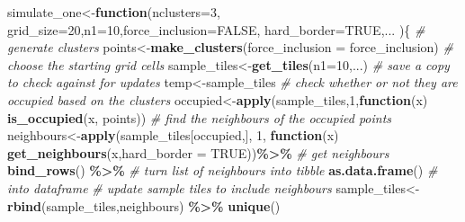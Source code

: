 \documentclass[
]{article}
\newenvironment{Shaded}{\begin{snugshade}}{\end{snugshade}}
\newcommand{\AttributeTok}[1]{\textcolor[rgb]{0.13,0.29,0.53}{#1}}
\newcommand{\CommentTok}[1]{\textcolor[rgb]{0.56,0.35,0.01}{\textit{#1}}}
\newcommand{\ConstantTok}[1]{\textcolor[rgb]{0.56,0.35,0.01}{#1}}
\newcommand{\ControlFlowTok}[1]{\textcolor[rgb]{0.13,0.29,0.53}{\textbf{#1}}}
\newcommand{\DecValTok}[1]{\textcolor[rgb]{0.00,0.00,0.81}{#1}}
\newcommand{\FunctionTok}[1]{\textcolor[rgb]{0.13,0.29,0.53}{\textbf{#1}}}
\newcommand{\NormalTok}[1]{#1}
\newcommand{\OtherTok}[1]{\textcolor[rgb]{0.56,0.35,0.01}{#1}}
\newcommand{\SpecialCharTok}[1]{\textcolor[rgb]{0.81,0.36,0.00}{\textbf{#1}}}
\begin{document}
\begin{Shaded}
\begin{Highlighting}[]
\NormalTok{simulate\_one}\OtherTok{\textless{}{-}}\ControlFlowTok{function}\NormalTok{(}\AttributeTok{nclusters=}\DecValTok{3}\NormalTok{, }\AttributeTok{grid\_size=}\DecValTok{20}\NormalTok{,}\AttributeTok{n1=}\DecValTok{10}\NormalTok{,}\AttributeTok{force\_inclusion=}\ConstantTok{FALSE}\NormalTok{, }\AttributeTok{hard\_border=}\ConstantTok{TRUE}\NormalTok{,... )\{}
  \CommentTok{\# generate clusters}
\NormalTok{  points}\OtherTok{\textless{}{-}}\FunctionTok{make\_clusters}\NormalTok{(}\AttributeTok{force\_inclusion =}\NormalTok{ force\_inclusion)}
  \CommentTok{\# choose the starting grid cells}
\NormalTok{  sample\_tiles}\OtherTok{\textless{}{-}}\FunctionTok{get\_tiles}\NormalTok{(}\AttributeTok{n1=}\DecValTok{10}\NormalTok{,...)}
  \CommentTok{\# save a copy to check against for updates}
\NormalTok{  temp}\OtherTok{\textless{}{-}}\NormalTok{sample\_tiles}
  \CommentTok{\# check whether or not they are occupied based on the clusters}
\NormalTok{  occupied}\OtherTok{\textless{}{-}}\FunctionTok{apply}\NormalTok{(sample\_tiles,}\DecValTok{1}\NormalTok{,}\ControlFlowTok{function}\NormalTok{(x) }\FunctionTok{is\_occupied}\NormalTok{(x, points))}
  \CommentTok{\# find the neighbours of the occupied points}
\NormalTok{  neighbours}\OtherTok{\textless{}{-}}\FunctionTok{apply}\NormalTok{(sample\_tiles[occupied,], }\DecValTok{1}\NormalTok{, }\ControlFlowTok{function}\NormalTok{(x) }\FunctionTok{get\_neighbours}\NormalTok{(x,}\AttributeTok{hard\_border =} \ConstantTok{TRUE}\NormalTok{))}\SpecialCharTok{\%\textgreater{}\%} \CommentTok{\# get neighbours}
    \FunctionTok{bind\_rows}\NormalTok{() }\SpecialCharTok{\%\textgreater{}\%} \CommentTok{\# turn list of neighbours into tibble}
    \FunctionTok{as.data.frame}\NormalTok{() }\CommentTok{\# into dataframe}
  \CommentTok{\# update sample tiles to include neighbours}
\NormalTok{  sample\_tiles}\OtherTok{\textless{}{-}}\FunctionTok{rbind}\NormalTok{(sample\_tiles,neighbours) }\SpecialCharTok{\%\textgreater{}\%}
    \FunctionTok{unique}\NormalTok{()}
  

\end{Highlighting}
\end{Shaded}
\end{document}

